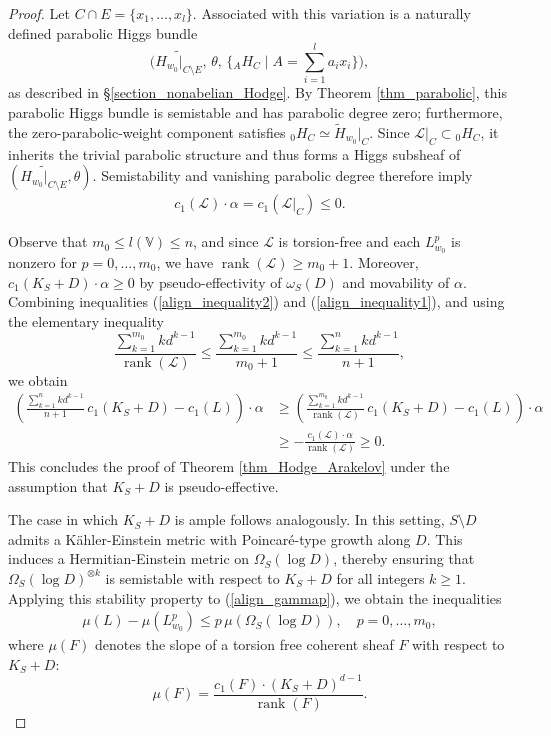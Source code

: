 \documentclass[11pt,letterpaper]{amsart}
\numberwithin{equation}{section}
\begin{document}
\begin{proof}
	Let $C \cap E = \{x_1, \dots, x_l\}$. Associated with this variation is a naturally defined parabolic Higgs bundle  
	\[
	\big(\widetilde{H_{w_0}|_{C \setminus E}},\, \theta,\, \{{}_A H_C \mid A = \textstyle\sum_{i=1}^l a_i x_i\}\big),
	\]  
	as described in \S\ref{section_nonabelian_Hodge}. By Theorem \ref{thm_parabolic}, this parabolic Higgs bundle is semistable and has parabolic degree zero; furthermore, the zero-parabolic-weight component satisfies ${}_0 H_C \simeq \widetilde{H}_{w_0}|_C$. Since $\mathcal{L}|_C \subset {}_0 H_C$, it inherits the trivial parabolic structure and thus forms a Higgs subsheaf of $(\widetilde{H_{w_0}|_{C \setminus E}}, \theta)$. Semistability and vanishing parabolic degree therefore imply  
	\begin{align}\label{align_inequality2}
		c_1(\mathcal{L}) \cdot \alpha = c_1(\mathcal{L}|_C) \leq 0.
	\end{align}
	
	Observe that $m_0 \leq l(\mathbb{V}) \leq n$, and since $\mathcal{L}$ is torsion-free and each $L^p_{w_0}$ is nonzero for $p = 0, \dots, m_0$, we have $\operatorname{rank}(\mathcal{L}) \geq m_0 + 1$. Moreover, $c_1(K_S + D) \cdot \alpha \geq 0$ by pseudo-effectivity of $\omega_S(D)$ and movability of $\alpha$.
	Combining inequalities (\ref{align_inequality2}) and (\ref{align_inequality1}), and using the elementary inequality  
	\[
	\frac{\sum_{k=1}^{m_0} k d^{k-1}}{\operatorname{rank}(\mathcal{L})} \leq \frac{\sum_{k=1}^{m_0} k d^{k-1}}{m_0 + 1} \leq \frac{\sum_{k=1}^{n} k d^{k-1}}{n + 1},
	\]  
	we obtain  
	\begin{align*}
		\left( \frac{\sum_{k=1}^{n} k d^{k-1}}{n + 1}\, c_1(K_S + D) - c_1(L) \right) \cdot \alpha 
		&\geq \left( \frac{\sum_{k=1}^{m_0} k d^{k-1}}{\operatorname{rank}(\mathcal{L})}\, c_1(K_S + D) - c_1(L) \right) \cdot \alpha \\
		&\geq -\frac{c_1(\mathcal{L}) \cdot \alpha}{\operatorname{rank}(\mathcal{L})} \geq 0.
	\end{align*}  
	This concludes the proof of Theorem \ref{thm_Hodge_Arakelov} under the assumption that $K_S + D$ is pseudo-effective.
	
	The case in which $K_S + D$ is ample follows analogously. In this setting, $S \setminus D$ admits a K\"ahler-Einstein metric with Poincar\'e-type growth along $D$. This induces a Hermitian-Einstein metric on $\Omega_S(\log D)$, thereby ensuring that $\Omega_S(\log D)^{\otimes k}$ is semistable with respect to $K_S + D$ for all integers $k \geq 1$. Applying this stability property to (\ref{align_gammap}), we obtain the inequalities  
	\begin{align*}  
		\mu(L) - \mu(L_{w_0}^p) \leq p\,\mu(\Omega_S(\log D)), \quad p = 0, \dots, m_0,  
	\end{align*}  
	where $\mu(F)$ denotes the slope of a torsion free coherent sheaf $F$ with respect to $K_S + D$:
	\[
	\mu(F) = \frac{c_1(F) \cdot (K_S + D)^{d-1}}{\operatorname{rank}(F)}.  
	\]  
	

\end{proof}
\end{document}
